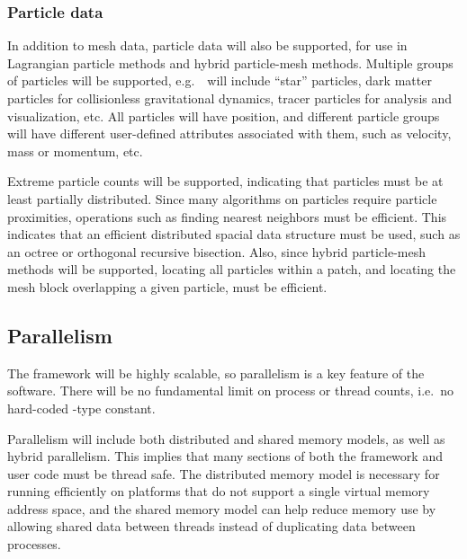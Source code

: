 \documentclass[10pt,twocolumn]{article}
\begin{document}
\subsubsection{Particle data} \label{sss:require-particles}

In addition to mesh data, particle data will also be supported, for
use in Lagrangian particle methods and hybrid particle-mesh methods.
Multiple groups of particles will be supported, e.g.~\enzoii\ will
include ``star'' particles, dark matter particles for collisionless
gravitational dynamics, tracer particles for analysis and
visualization, etc.  All particles will have position, and different particle
groups will have different user-defined attributes associated with them, such
as velocity, mass or momentum, etc.

Extreme particle counts will be supported, indicating that particles
must be at least partially distributed.  Since many algorithms on
particles require particle proximities, operations such as finding
nearest neighbors must be efficient.  This indicates that an efficient
distributed spacial data structure must be used, such as an octree or
orthogonal recursive bisection.  Also, since hybrid particle-mesh
methods will be supported, locating all particles within a patch, and
locating the mesh block overlapping a given particle, must be
efficient.


\subsection{Parallelism} \label{ss:require-parallel}

The framework will be highly scalable, so parallelism is a key feature
of the software.  There will be no fundamental limit on process or
thread counts, i.e.~no hard-coded -type
constant.

Parallelism will include both distributed and shared memory models, as
well as hybrid parallelism.  This implies that many sections of both
the framework and user code must be thread safe.  The distributed
memory model is necessary for running efficiently on platforms that do
not support a single virtual memory address space, and the shared
memory model can help reduce memory use by allowing shared data
between threads instead of duplicating data between processes.
\end{document}
